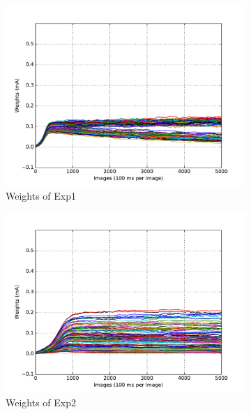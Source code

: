 \begin{figure}
	\centering
	\begin{subfigure}[t]{0.4\textwidth}
		\includegraphics[width=\textwidth]{pics_sdlm/13_exp_SRBM_noise_long/exp1_weights_s.pdf}
		\caption{Weights of Exp1}
	\end{subfigure}
	\begin{subfigure}[t]{0.4\textwidth}
		\includegraphics[width=\textwidth]{pics_sdlm/13_exp_SRBM_noise_long/exp2_weights_s.pdf}
		\caption{Weights of Exp2}
	\end{subfigure}
	\begin{subfigure}[t]{0.4\textwidth}

\end{subfigure}
\end{figure}
